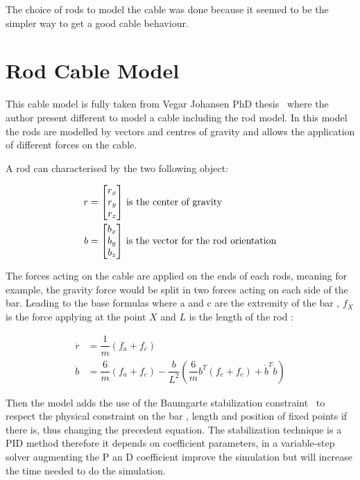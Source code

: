 The choice of rods to model the cable was done because it seemed to be the simpler
way to get a good cable behaviour.
\section{Rod Cable Model}

This cable model is fully taken from  Vegar Johansen PhD thesis~\cite{johansen2007modelling} where the author present different to model a cable including the rod model. In this model the rods are modelled by vectors and centres of gravity and allows the application of different forces on the cable.

A rod can characterised by the two following object:

\begin{align}
r &= \begin{bmatrix}
    r_x \\
    r_y \\
    r_z
\end{bmatrix}\, \textnormal{is the center of gravity}\\
b &= \begin{bmatrix}
    b_x \\
    b_y \\
    b_z
\end{bmatrix}\, \textnormal{is the vector for the rod orientation}
\end{align}

The forces acting on the cable are applied on the ends of each rods, meaning for example, the gravity force would be split in two forces acting on each side of the bar. Leading to the base formulas where a and c are the extremity of the bar ,  $f_X$ is the force applying at the point $X$ and $L$ is the length of the rod :

\begin{align}
\ddot{r} &= \dfrac{1}{m}  (f_a+f_c) \\
\ddot{b} &=  \dfrac{6}{m}(f_a+f_c) - \dfrac{b}{L^{2}}  (\dfrac{6}{m}b^{T}(f_c+f_c)+\dot{b}^{T}\dot{b}) 
\end{align}



Then the model adds the use of the Baumgarte stabilization constraint~\cite{baumgarte1972stabilization} to respect the physical constraint on the bar , length and position of fixed points if there is, thus changing the precedent equation. 
The stabilization technique is a PID method therefore it depends on coefficient parameters, in a variable-step solver augmenting the P an D coefficient improve the simulation but will increase the time needed to do the simulation.

